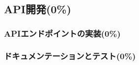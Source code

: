   \subsection{API開発(0\%)}
    \label{sec:API開発}
      \par
      
      \subsubsection{APIエンドポイントの実装(0\%)}
        \label{sec:APIエンドポイントの実装}
          \par
          
      \subsubsection{ドキュメンテーションとテスト(0\%)}
        \label{sec:ドキュメンテーションとテスト}
          \par
